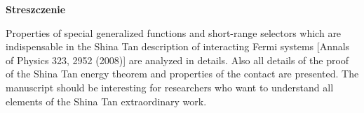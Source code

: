 \begin{center}
\begin{LARGE}\textbf{Streszczenie}\end{LARGE}
\end{center}

\vspace{1.0cm}

Properties of special generalized functions and short-range selectors which are indispensable in the Shina Tan description of interacting Fermi systems [Annals of Physics 323, 2952 (2008)] are analyzed in details. Also all details of the proof of the Shina Tan energy theorem and properties of the contact are presented. The manuscript should be interesting for researchers who want to understand all elements of the Shina Tan extraordinary work.